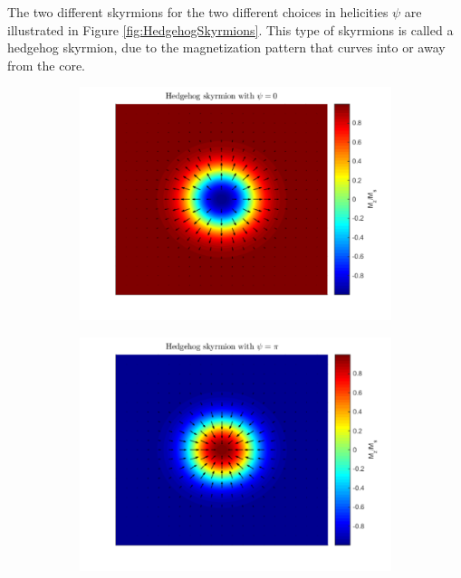 The two different skyrmions for the two different choices in helicities $\psi$ are illustrated in Figure \ref{fig:HedgehogSkyrmions}. This type of skyrmions is called a hedgehog skyrmion, due to the magnetization pattern that curves into or away from the core.
\begin{figure}[h!]
\centering
\begin{subfigure}{.49\textwidth}
  \centering
  \includegraphics[width=\linewidth]{Figures/HedgehogSkyrmionPsi0.pdf}
  \caption{}
  \label{fig:HedgehogSkyrmion1}
\end{subfigure}
\begin{subfigure}{.49\textwidth}
  \centering
  \includegraphics[width=\linewidth]{Figures/HedgehogSkyrmionPsiPi.pdf}

\end{subfigure}
\end{figure}
